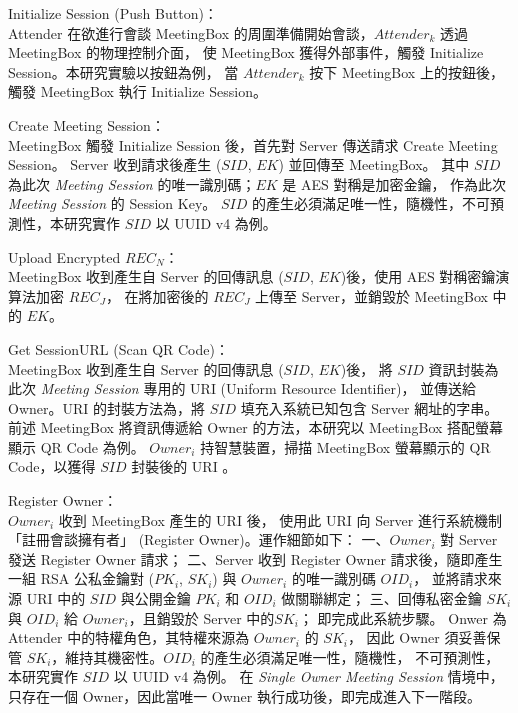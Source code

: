 \begin{steps}
    \item Initialize Session (Push Button)：\\
        Attender 在欲進行會談 MeetingBox 的周圍準備開始會談，$Attender_{k}$ 透過 MeetingBox 的物理控制介面，
        使 MeetingBox 獲得外部事件，觸發 Initialize Session。本研究實驗以按鈕為例，
        當 $Attender_{k}$ 按下 MeetingBox 上的按鈕後，觸發 MeetingBox 執行 Initialize Session。

    \item Create Meeting Session：\\
        MeetingBox 觸發 Initialize Session 後，首先對 Server 傳送請求 Create Meeting Session。
        Server 收到請求後產生 ($SID$, $EK$) 並回傳至 MeetingBox。
        其中 $SID$ 為此次 {\it Meeting Session} 的唯一識別碼；$EK$ 是 AES 對稱是加密金鑰，
        作為此次 {\it Meeting Session} 的 Session Key。
        $SID$ 的產生必須滿足唯一性，隨機性，不可預測性，本研究實作 $SID$ 以 UUID v4 為例。

    \item Upload Encrypted $REC_{N}$：\\
        MeetingBox 收到產生自 Server 的回傳訊息 ($SID$, $EK$)後，使用 AES 對稱密鑰演算法加密 $REC_{J}$，
        在將加密後的 $REC_{J}$ 上傳至 Server，並銷毀於 MeetingBox 中的 $EK$。

    \item Get SessionURL (Scan QR Code)：\\
        MeetingBox 收到產生自 Server 的回傳訊息 ($SID$, $EK$)後，
        將 $SID$ 資訊封裝為此次 {\it Meeting Session} 專用的 URI (Uniform Resource Identifier)，
        並傳送給 Owner。URI 的封裝方法為，將 $SID$ 填充入系統已知包含 Server 網址的字串。
        前述 MeetingBox 將資訊傳遞給 Owner 的方法，本研究以 MeetingBox 搭配螢幕顯示 QR Code 為例。
        $Owner_{i}$ 持智慧裝置，掃描 MeetingBox 螢幕顯示的 QR Code，以獲得 $SID$ 封裝後的 URI 。

    \item Register Owner：\\
        $Owner_{i}$ 收到 MeetingBox 產生的 URI 後，
        使用此 URI 向 Server 進行系統機制「註冊會談擁有者」 (Register Owner)。運作細節如下：
        一、$Owner_{i}$ 對 Server 發送 Register Owner 請求；
        二、Server 收到 Register Owner 請求後，隨即產生一組 RSA 公私金鑰對 ($PK_{i}$, $SK_{i}$)
        與 $Owner_{i}$ 的唯一識別碼 $OID_{i}$，
        並將請求來源 URI 中的 $SID$ 與公開金鑰 $PK_{i}$ 和 $OID_{i}$ 做關聯綁定；
        三、回傳私密金鑰 $SK_{i}$ 與 $OID_{i}$ 給 $Owner_{i}$，且銷毀於 Server 中的$SK_{i}$；
        即完成此系統步驟。
        Onwer 為 Attender 中的特權角色，其特權來源為 $Owner_{i}$ 的 $SK_{i}$，
        因此 Owner 須妥善保管 $SK_{i}$，維持其機密性。$OID_{i}$ 的產生必須滿足唯一性，隨機性，
        不可預測性，本研究實作 $SID$ 以 UUID v4 為例。
        在 {\it Single Owner Meeting Session} 情境中，
        只存在一個 Owner，因此當唯一 Owner 執行成功後，即完成進入下一階段。
\end{steps}

